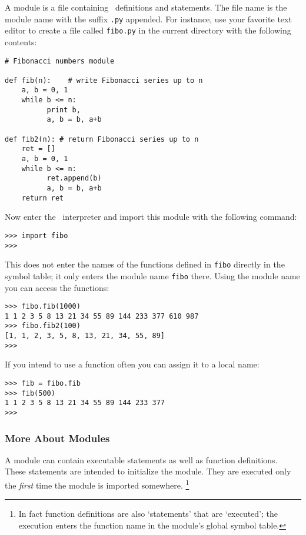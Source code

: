 A module is a file containing \Python\ definitions and statements.
The file name is the module name with the suffix
{\tt .py}
appended.
For instance, use your favorite text editor to create a file called
{\tt fibo.py}
in the current directory with the following contents:
\begin{code}\begin{verbatim}
# Fibonacci numbers module

def fib(n):    # write Fibonacci series up to n
    a, b = 0, 1
    while b <= n:
          print b,
          a, b = b, a+b

def fib2(n): # return Fibonacci series up to n
    ret = []
    a, b = 0, 1
    while b <= n:
          ret.append(b)
          a, b = b, a+b
    return ret
\end{verbatim}\end{code}
Now enter the \Python\ interpreter and import this module with the
following command:
\begin{code}\begin{verbatim}
>>> import fibo
>>> 
\end{verbatim}\end{code}
This does not enter the names of the functions defined in
{\tt fibo}
directly in the symbol table; it only enters the module name
{\tt fibo}
there.
Using the module name you can access the functions:
\begin{code}\begin{verbatim}
>>> fibo.fib(1000)
1 1 2 3 5 8 13 21 34 55 89 144 233 377 610 987
>>> fibo.fib2(100)
[1, 1, 2, 3, 5, 8, 13, 21, 34, 55, 89]
>>> 
\end{verbatim}\end{code}
If you intend to use a function often you can assign it to a local name:
\begin{code}\begin{verbatim}
>>> fib = fibo.fib
>>> fib(500)
1 1 2 3 5 8 13 21 34 55 89 144 233 377
>>> 
\end{verbatim}\end{code}

\subsubsection{More About Modules}

A module can contain executable statements as well as function
definitions.
These statements are intended to initialize the module.
They are executed only the
{\it first}
time the module is imported somewhere.%
\footnote{
	In fact function definitions are also `statements' that are
	`executed'; the execution enters the function name in the
	module's global symbol table.
}


